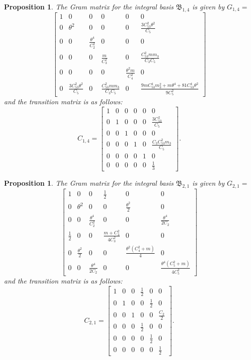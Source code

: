 \documentclass[table]{amsart}
\newtheorem{proposition}[theorem]{Proposition}
\numberwithin{equation}{section}
\begin{document}
\begin{proposition}
    The Gram matrix for the integral basis $\mathfrak{B}_{1,4}$ is given by $G_{1,4}=$
    \[
\begin{bmatrix}
1 & 0 & 0 & 0 & 0 & 0 \\[8pt]
0 & \theta^2 & 0 & 0 & 0 & \tfrac{3C_{53}^2 \theta^2}{ C_5} \\[8pt]
0 & 0 & \tfrac{\theta^4}{C_2^2} & 0 & 0 & 0 \\[8pt]
0 & 0 & 0 & \tfrac{m}{C_3^2} & 0 & \tfrac{C_{53}^2 m m_3}{C_3 C_5} \\[8pt]
0 & 0 & 0 & 0 & \tfrac{\theta^2 m}{C_4^2} & 0 \\[8pt]
0 & \tfrac{3C_{53}^2 \theta^2}{ C_5} & 0 & \tfrac{C_{53}^2 m m_3}{C_3 C_5} & 0 & \tfrac{9 m  C_{53}^4 m_3^2 + m  \theta^4 + 81 C_{53}^4 \theta^2}{9  C_5^2}
\end{bmatrix}
\] and the transition matrix is as follows: 
\[
C_{1,4}=\begin{bmatrix}
1 & 0 & 0 & 0 & 0 & 0 \\[8pt]
0 & 1 & 0 & 0 & 0 & \tfrac{3 C_{53}^2}{C_5} \\[8pt]
0 & 0 & 1 & 0 & 0 & 0 \\[8pt]
0 & 0 & 0 & 1 & 0 & \tfrac{C_3 C_{53}^2 m_3}{C_5} \\[8pt]
0 & 0 & 0 & 0 & 1 & 0 \\[8pt]
0 & 0 & 0 & 0 & 0 & \tfrac{1}{3}
\end{bmatrix}.
\]
\end{proposition}
\begin{proposition}
    The Gram matrix for the integral basis $\mathfrak{B}_{2,1}$ is given by $G_{2,1}=$
    \[
\begin{bmatrix}
1 & 0 & 0 & \tfrac{1}{2} & 0 & 0 \\[8pt]
0 & \theta^2 & 0 & 0 & \tfrac{\theta^2}{2} & 0 \\[8pt]
0 & 0 & \tfrac{\theta^4}{C_2^2} & 0 & 0 & \tfrac{\theta^4}{2C_2} \\[8pt]
\tfrac{1}{2} & 0 & 0 & \tfrac{m+C_3^2}{4C_3^2} & 0 & 0 \\[8pt]
0 & \tfrac{\theta^2}{2} & 0 & 0 & \tfrac{\theta^2(C_4^2+m)}{4}  & 0 \\[8pt]
0 & 0 & \tfrac{\theta^4}{2C_2} & 0 & 0 & \tfrac{\theta^4(C_5^2 + m)}{4C_5^2}
\end{bmatrix}
\]
and the transition matrix is as follows:
\[
C_{2,1}=\begin{bmatrix}
1 & 0 & 0 & \tfrac{1}{2} & 0 & 0 \\[8pt]
0 & 1 & 0 & 0 & \tfrac{1}{2} & 0 \\[8pt]
0 & 0 & 1 & 0 & 0 & \tfrac{C_2}{2} \\[8pt]
0 & 0 & 0 & \tfrac{1}{2} & 0 & 0 \\[8pt]
0 & 0 & 0 & 0 & \tfrac{1}{2} & 0 \\[8pt]
0 & 0 & 0 & 0 & 0 & \tfrac{1}{2}
\end{bmatrix}.
\]
\end{proposition}
\end{document}
